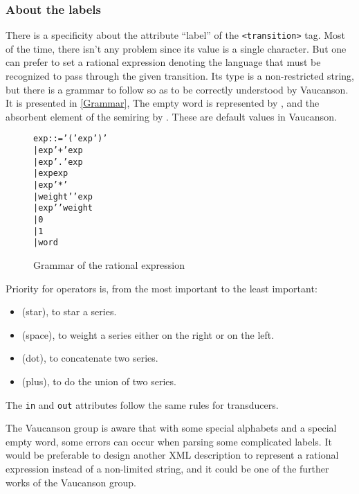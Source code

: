 \documentclass[a4paper]{article}
\newcommand{\Vauc}{{\sc Vaucanson}\xspace}
\newcommand{\xtag}[1]{\texttt{<#1>}}
\def\transitiontag{\xtag{transition}}
\begin{document}
\subsubsection{About the labels}

There is a specificity about the attribute ``label'' of the
\transitiontag{} tag. Most of the time, there isn't any problem since
its value is a single character. But one can prefer to set a rational
expression denoting the language that must be recognized to pass
through the given transition. Its type is a non-restricted string, but
there is a grammar to follow so as to be correctly understood by
\Vauc. It is presented in \autoref{Grammar}, The empty word is
represented by , and the absorbent element of the semiring by
.  These are default values in \Vauc.

\begin{figure}[ht]
  \small
  \begin{center}
\begin{alltt}
     exp ::= '(' exp ')'
         |   exp '+' exp
         |   exp '.' exp
         |   exp exp
         |   exp '*'
         |   weight ' ' exp
         |   exp ' ' weight
         |   0
         |   1
         |   word
\end{alltt}

\caption{Grammar of the rational expression}
\label{Grammar}
  \end{center}
\end{figure}

Priority for operators is, from the most important to the least
important:
\begin{itemize}
\item \samp{*} (star), to star a series.
\item \samp{ } (space), to weight a series either on the right or on
  the left.
\item {} (dot), to concatenate two series.
\item \samp{+} (plus), to do the union of two series.
\end{itemize}

The \verb|in| and \verb|out| attributes follow the same rules for
transducers.

The \Vauc group is aware that with some special alphabets and a
special empty word, some errors can occur when parsing some
complicated labels.  It would be preferable to design another XML
description to represent a rational expression instead of a
non-limited string, and it could be one of the further works of the
\Vauc{} group.
\end{document}
